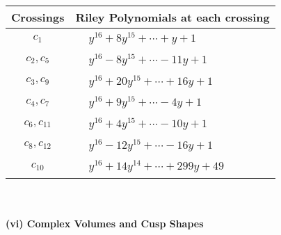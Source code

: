 \documentclass[1p]{elsarticle_modified}
\theoremstyle{definition}
\begin{document}
\begin{tabular}{m{50pt}|m{274pt}}
Crossings & \hspace{64pt}Riley Polynomials at each crossing \\
\hline $$\begin{aligned}c_{1}\end{aligned}$$&$\begin{aligned}
&y^{16}+8 y^{15}+\cdots+y+1
\end{aligned}$\\
\hline $$\begin{aligned}c_{2},c_{5}\end{aligned}$$&$\begin{aligned}
&y^{16}-8 y^{15}+\cdots-11 y+1
\end{aligned}$\\
\hline $$\begin{aligned}c_{3},c_{9}\end{aligned}$$&$\begin{aligned}
&y^{16}+20 y^{15}+\cdots+16 y+1
\end{aligned}$\\
\hline $$\begin{aligned}c_{4},c_{7}\end{aligned}$$&$\begin{aligned}
&y^{16}+9 y^{15}+\cdots-4 y+1
\end{aligned}$\\
\hline $$\begin{aligned}c_{6},c_{11}\end{aligned}$$&$\begin{aligned}
&y^{16}+4 y^{15}+\cdots-10 y+1
\end{aligned}$\\
\hline $$\begin{aligned}c_{8},c_{12}\end{aligned}$$&$\begin{aligned}
&y^{16}-12 y^{15}+\cdots-16 y+1
\end{aligned}$\\
\hline $$\begin{aligned}c_{10}\end{aligned}$$&$\begin{aligned}
&y^{16}+14 y^{14}+\cdots+299 y+49
\end{aligned}$\\
\hline
\end{tabular}\\~\\
\newpage\flushleft \textbf{(vi) Complex Volumes and Cusp Shapes}
\end{document}
